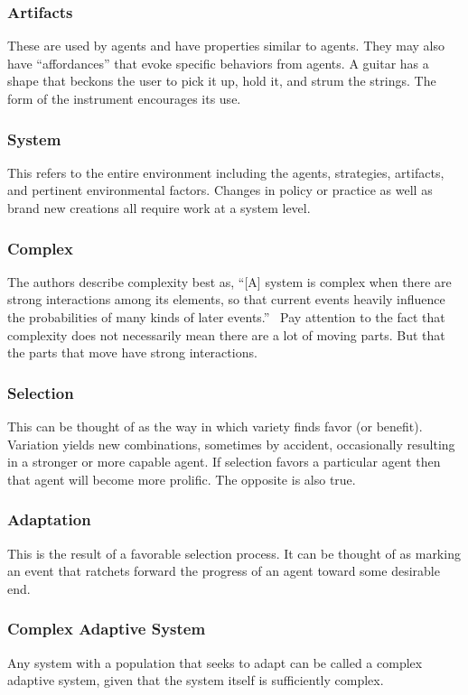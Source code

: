 \documentclass[jou,apacite]{apa6}
\begin{document}
\subsubsection{Artifacts}
These are used by agents and have properties similar to agents.  They may also have ``affordances'' that evoke specific behaviors from agents. A guitar has a shape that beckons the user to pick it up, hold it, and strum the strings.  The form of the instrument encourages its use.

\subsubsection{System}
This refers to the entire environment including the agents, strategies, artifacts, and pertinent environmental factors.  Changes in policy or practice as well as brand new creations all require work at a system level.

\subsubsection{Complex}
The authors describe complexity best as, ``[A] system is complex when there are strong interactions among its elements, so that current events heavily influence the probabilities of many kinds of later events.''~\cite[page 7]{Axelrod}  Pay attention to the fact that complexity does not necessarily mean there are a lot of moving parts.  But that the parts that move have strong interactions.

\subsubsection{Selection}
This can be thought of as the way in which variety finds favor (or benefit).  Variation yields new combinations, sometimes by accident, occasionally resulting in a stronger or more capable agent.  If selection favors a particular agent then that agent will become more prolific.  The opposite is also true.

\subsubsection{Adaptation}
This is the result of a favorable selection process.  It can be thought of as marking an event that ratchets forward the progress of an agent toward some desirable end.

\subsubsection{Complex Adaptive System}
Any system with a population that seeks to adapt can be called a complex adaptive system, given that the system itself is sufficiently complex.
\end{document}
